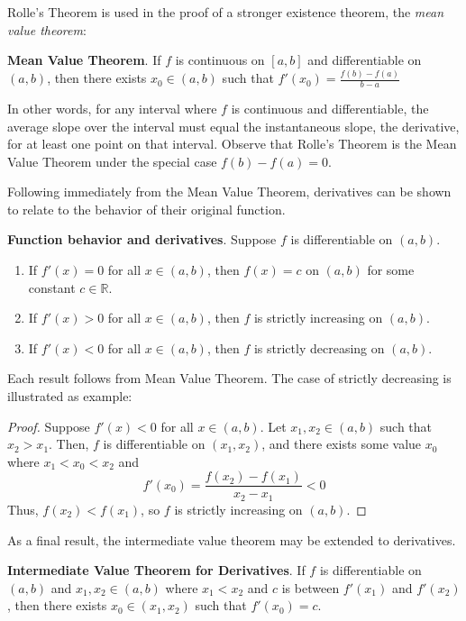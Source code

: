 Rolle's Theorem is used in the proof of a stronger existence theorem, the \textit{mean value theorem}:

\textbf{Mean Value Theorem}. If $f$ is continuous on $[a,b]$ and differentiable on $(a,b)$, then there exists $x_0\in (a,b)$ such that $f'(x_0) = \frac{f(b)-f(a)}{b-a}$

In other words, for any interval where $f$ is continuous and differentiable, the average slope over the interval must equal the instantaneous slope, the derivative, for at least one point on that interval. Observe that Rolle's Theorem is the Mean Value Theorem under the special case $f(b)-f(a)=0$.

Following immediately from the Mean Value Theorem, derivatives can be shown to relate to the behavior of their original function.

\begin{shaded}
    \textbf{Function behavior and derivatives}. Suppose $f$ is differentiable on $(a,b)$.
    \begin{enumerate}
        \item[] If $f'(x) = 0$ for all $x\in(a,b)$, then $f(x)=c$ on $(a,b)$ for some constant $c\in \mathbb{R}$.
        \item[] If $f'(x) > 0$ for all $x\in (a,b)$, then $f$ is strictly increasing on $(a,b)$.
        \item[] If $f'(x) < 0$ for all $x\in (a,b)$, then $f$ is strictly decreasing on $(a,b)$.
    \end{enumerate}
\end{shaded}

Each result follows from Mean Value Theorem. The case of strictly decreasing is illustrated as example:

\begin{proof}
    Suppose $f'(x)<0$ for all $x\in (a,b)$. Let $x_1,x_2\in (a,b)$ such that $x_2 > x_1$. Then, $f$ is differentiable on $(x_1,x_2)$, and there exists some value $x_0$ where $x_1< x_0< x_2$ and \[f'(x_0) = \frac{f(x_2)-f(x_1)}{x_2-x_1} < 0\] Thus, $f(x_2) < f(x_1)$, so $f$ is strictly increasing on $(a,b)$.
\end{proof}

As a final result, the intermediate value theorem may be extended to derivatives. 

\textbf{Intermediate Value Theorem for Derivatives}. If $f$ is differentiable on $(a,b)$ and $x_1,x_2\in(a,b)$ where $x_1<x_2$ and $c$ is between $f'(x_1)$ and $f'(x_2)$, then there exists $x_0\in(x_1,x_2)$ such that $f'(x_0)=c$.

